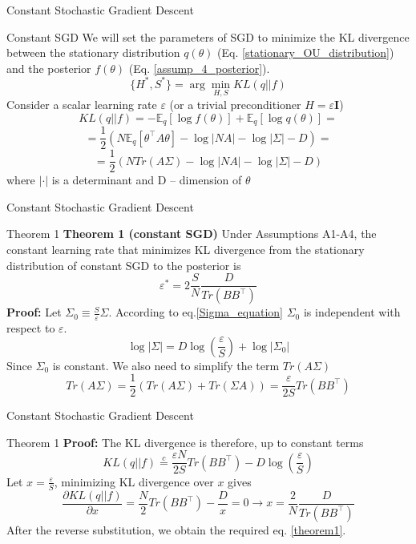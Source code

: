 \documentclass{beamer}
\begin{document}
\begin{frame}{Constant Stochastic Gradient Descent} 
    \begin{block}{Constant SGD} 
        We will set the parameters of SGD to minimize the KL divergence between the stationary distribution $q(\theta)$ (Eq. \ref{stationary_OU_distribution}) and the posterior $f(\theta)$ (Eq. \ref{assump_4_posterior}).
        \begin{equation}\label{KL_minimize}
            \{H^{*}, S^*\} = \arg\min_{H, S}KL(q || f)
        \end{equation}
        Consider a scalar learning rate $\varepsilon$ (or a trivial preconditioner $H = \varepsilon\boldsymbol{I}$)
        \[KL(q || f) = -\mathbb{E}_q[\log f(\theta)] + \mathbb{E}_q[\log q(\theta)] = \] 
        \[= \dfrac{1}{2}\left(N\mathbb{E}_q[\theta^{\top}A\theta] - \log|NA| - \log|\Sigma| - D\right) = \]
        \[= \dfrac{1}{2}\left(NTr(A\Sigma) - \log|NA| - \log|\Sigma| - D\right)\]
        where $\vert \cdot \vert$ is a determinant and D -- dimension of $\theta$
    \end{block} 
\end{frame}

\begin{frame}{Constant Stochastic Gradient Descent}
    \begin{block}{Theorem 1}
         \textbf{Theorem 1 (constant SGD)} Under Assumptions A1-A4, the constant learning rate that minimizes KL divergence from the stationary distribution of constant SGD to the posterior is 
         \begin{equation}\label{theorem1}
             \varepsilon^* = 2\frac{S}{N}\frac{D}{Tr(BB^{\top})}
         \end{equation}
         \textbf{Proof:} Let $\Sigma_0 \equiv \frac{S}{\varepsilon}\Sigma$. According to eq.\ref{Sigma_equation} $\Sigma_0$ is independent with respect to $\varepsilon$.
         \[\log |\Sigma| = D \log\left(\frac{\varepsilon}{S}\right) + \log |\Sigma_0|\]
         Since $\Sigma_0$ is constant. We also need to simplify the term $Tr(A\Sigma)$
         \[Tr(A\Sigma) = \dfrac{1}{2}(Tr(A\Sigma) + Tr(\Sigma A)) = \frac{\varepsilon}{2S}Tr(BB^{\top})\]
    \end{block}
\end{frame}
         
\begin{frame}{Constant Stochastic Gradient Descent} 
    \begin{block}{Theorem 1} 
        \textbf{Proof:} The KL divergence is therefore, up to constant terms
         \begin{equation}
             KL(q||f) \overset{c}{=} \frac{\varepsilon N}{2S}Tr(BB^{\top}) - D \log\left(\frac{\varepsilon}{S}\right)
         \end{equation}
         Let $x = \frac{\varepsilon}{S}$, minimizing KL divergence over $x$ gives
         \[\frac{\partial KL(q||f)}{\partial x} = \frac{N}{2}Tr(BB^{\top}) - \frac{D}{x} = 0 \rightarrow x = \frac{2}{N}\frac{D}{Tr(BB^{\top})}\]
         After the reverse substitution, we obtain the required eq. \ref{theorem1}.
    \end{block}
\end{frame}
    
\end{document}
